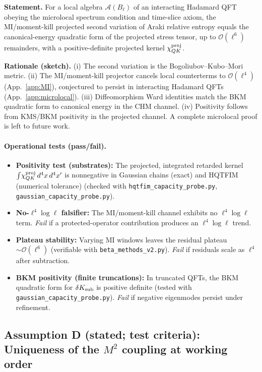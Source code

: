\documentclass[aps,prd,onecolumn,superscriptaddress,nofootinbib]{revtex4-2}
\begin{document}
\noindent\textbf{Statement.} For a local algebra \(\mathcal A(B_\ell)\) of an interacting Hadamard QFT obeying the microlocal spectrum condition and time-slice axiom, the MI/moment-kill projected second variation of Araki relative entropy equals the canonical-energy quadratic form of the projected stress tensor, up to \(\mathcal O(\ell^6)\) remainders, with a positive-definite projected kernel \(\chi_{QK}^{\rm proj}\).

\smallskip
\noindent\textbf{Rationale (sketch).} (i) The second variation is the Bogoliubov–Kubo–Mori metric. (ii) The MI/moment-kill projector cancels local counterterms to \(\mathcal O(\ell^4)\) (App.~\ref{app:MI}), conjectured to persist in interacting Hadamard QFTs (App.~\ref{app:microlocal}). (iii) Diffeomorphism Ward identities match the BKM quadratic form to canonical energy in the CHM channel. (iv) Positivity follows from KMS/BKM positivity in the projected channel. A complete microlocal proof is left to future work.

\paragraph{Operational tests (pass/fail).}
\begin{itemize}[leftmargin=*,noitemsep,topsep=0pt]
\item \textbf{Positivity test (substrates):} The projected, integrated retarded kernel \(\int\!\chi^{\rm proj}_{QK}\,d^4x\,d^4x'\) is nonnegative in Gaussian chains (exact) and HQTFIM (numerical tolerance) (checked with \texttt{hqtfim\_capacity\_probe.py}, \texttt{gaussian\_capacity\_probe.py}).
\item \textbf{No-\(\ell^4\log\ell\) falsifier:} The MI/moment-kill channel exhibits no \(\ell^4\log\ell\) term. \emph{Fail} if a protected-operator contribution produces an \(\ell^4\log\ell\) trend.
\item \textbf{Plateau stability:} Varying MI windows leaves the residual plateau \(\sim\mathcal O(\ell^6)\) (verifiable with \texttt{beta\_methods\_v2.py}). \emph{Fail} if residuals scale as \(\ell^4\) after subtraction.
\item \textbf{BKM positivity (finite truncations):} In truncated QFTs, the BKM quadratic form for \(\delta K_{\rm sub}\) is positive definite (tested with \texttt{gaussian\_capacity\_probe.py}). \emph{Fail} if negative eigenmodes persist under refinement.
\end{itemize}

\subsection{Assumption D (stated; test criteria): Uniqueness of the \texorpdfstring{$M^2$}{M^2} coupling at working order}
\label{sec:lemmaD}
\end{document}
